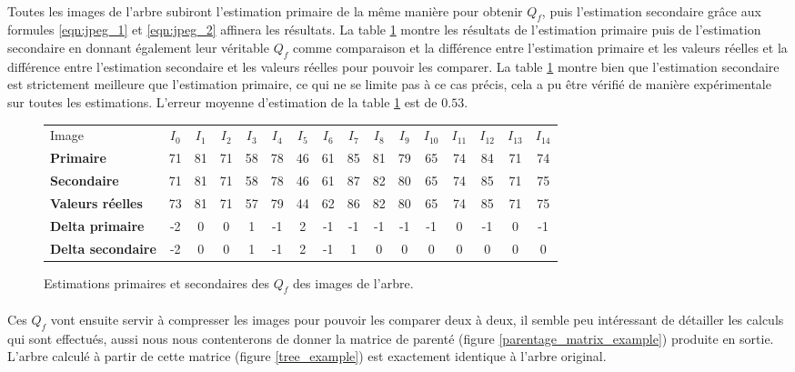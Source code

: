 \documentclass[utf8,final]{stageM2R} %
\begin{document}
\paragraph{}
Toutes les images de l'arbre subiront l'estimation primaire de la même manière pour obtenir $Q_f$, puis l'estimation secondaire grâce aux formules \ref{eqn:jpeg_1} et \ref{eqn:jpeg_2} affinera les résultats. La table \ref{rough_fine} montre les résultats de l'estimation primaire puis de l'estimation secondaire en donnant également leur véritable $Q_f$ comme comparaison et la différence entre l'estimation primaire et les valeurs réelles et la différence entre l'estimation secondaire et les valeurs réelles pour pouvoir les comparer. La table \ref{rough_fine} montre bien que l'estimation secondaire est strictement meilleure que l'estimation primaire, ce qui ne se limite pas à ce cas précis, cela a pu être vérifié de manière expérimentale sur toutes les estimations. L'erreur moyenne d'estimation de la table \ref{rough_fine} est de $0.53$.

\begin{figure}
  \begin{tabular}{|l||c|c|c|c|c|c|c|c|c|c|c|c|c|c|c|}
    \hline
    Image & $I_{0}$ & $I_{1}$ & $I_{2}$ & $I_{3}$ & $I_{4}$ & $I_{5}$ & $I_{6}$ & $I_{7}$ & $I_{8}$ & $I_{9}$ & $I_{10}$ & $I_{11}$ & $I_{12}$ & $I_{13}$ & $I_{14}$ \\ \hhline{|=::=|=|=|=|=|=|=|=|=|=|=|=|=|=|=|}
   
    \textbf{Primaire}  & 71 & 81 & 71 & 58 & 78 & 46 & 61 & 85 & 81 & 79 & 65 & 74 & 84 & 71 & 74 \\ \hline
    \textbf{Secondaire} & 71 & 81 & 71 & 58 & 78 & 46 & 61 & 87 & 82 & 80 & 65 & 74 & 85 & 71 & 75 \\ \hline
    \textbf{Valeurs réelles} & 73 & 81 & 71 & 57 & 79 & 44 & 62 & 86 & 82 & 80 & 65 & 74 & 85 & 71 & 75 \\ \hhline{|=::=|=|=|=|=|=|=|=|=|=|=|=|=|=|=|}
    \textbf{Delta primaire} & -2 & 0 & 0 & 1 & -1 & 2 & -1 & -1 & -1 & -1 & -1 & 0 & -1 & 0 & -1 \\ \hline
    \textbf{Delta secondaire} & -2 & 0 & 0 & 1 & -1 & 2 & -1 & 1 & 0 & 0 & 0 & 0 & 0 & 0 & 0 \\ \hline
  \end{tabular}

  \caption{Estimations primaires et secondaires des $Q_f$ des images de l'arbre.}
  \label{rough_fine}
\end{figure}

\paragraph{}
Ces $Q_f$ vont ensuite servir à compresser les images pour pouvoir les comparer deux à deux, il semble peu intéressant de détailler les calculs qui sont effectués, aussi nous nous contenterons de donner la matrice de parenté (figure \ref{parentage_matrix_example}) produite en sortie. L'arbre calculé à partir de cette matrice (figure \ref{tree_example}) est exactement identique à l'arbre original.
\end{document}
